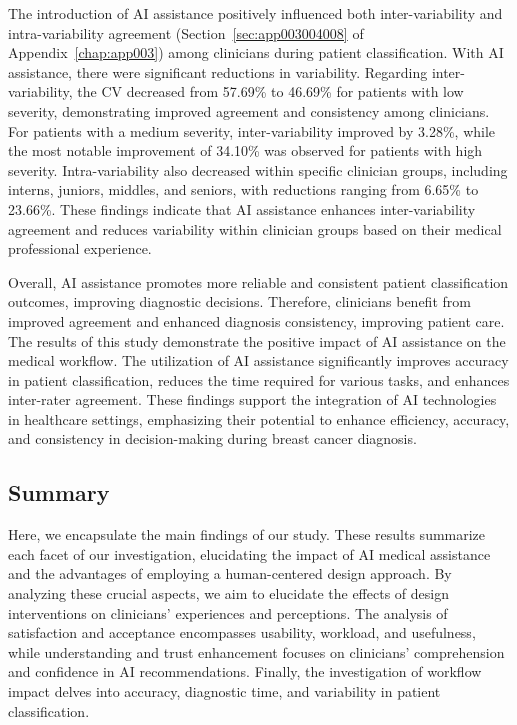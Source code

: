 The introduction of \ac{AI} assistance positively influenced both inter-variability and intra-variability agreement (Section~\ref{sec:app003004008} of Appendix~\ref{chap:app003}) among clinicians during patient classification.
With \ac{AI} assistance, there were significant reductions in variability.
Regarding inter-variability, the \ac{CV} decreased from 57.69\% to 46.69\% for patients with low severity, demonstrating improved agreement and consistency among clinicians.
For patients with a medium severity, inter-variability improved by 3.28\%, while the most notable improvement of 34.10\% was observed for patients with high severity.
Intra-variability also decreased within specific clinician groups, including interns, juniors, middles, and seniors, with reductions ranging from 6.65\% to 23.66\%.
These findings indicate that \ac{AI} assistance enhances inter-variability agreement and reduces variability within clinician groups based on their medical professional experience.

Overall, \ac{AI} assistance promotes more reliable and consistent patient classification outcomes, improving diagnostic decisions.
Therefore, clinicians benefit from improved agreement and enhanced diagnosis consistency, improving patient care.
The results of this study demonstrate the positive impact of \ac{AI} assistance on the medical workflow.
The utilization of \ac{AI} assistance significantly improves accuracy in patient classification, reduces the time required for various tasks, and enhances inter-rater agreement.
These findings support the integration of \ac{AI} technologies in healthcare settings, emphasizing their potential to enhance efficiency, accuracy, and consistency in decision-making during breast cancer diagnosis.

\subsection{Summary}
\label{sec:chap005006004}

Here, we encapsulate the main findings of our study.
These results summarize each facet of our investigation, elucidating the impact of \ac{AI} medical assistance and the advantages of employing a human-centered design approach.
By analyzing these crucial aspects, we aim to elucidate the effects of design interventions on clinicians' experiences and perceptions.
The analysis of satisfaction and acceptance encompasses usability, workload, and usefulness, while understanding and trust enhancement focuses on clinicians' comprehension and confidence in \ac{AI} recommendations.
Finally, the investigation of workflow impact delves into accuracy, diagnostic time, and variability in patient classification.

